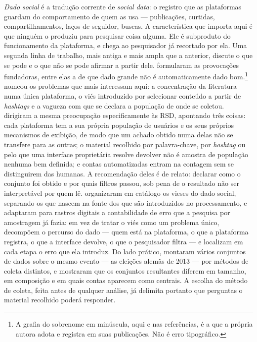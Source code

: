 \emph{Dado social} é a tradução corrente de \emph{social data}: o registro que as
plataformas guardam do comportamento de quem as usa --- publicações, curtidas,
compartilhamentos, laços de seguidor, buscas. A característica que importa aqui é que
ninguém o produziu para pesquisar coisa alguma. Ele é subproduto do funcionamento da
plataforma, e chega ao pesquisador já recortado por ela. Uma segunda linha de trabalho,
mais antiga e mais ampla que a anterior, discute o que se pode e o que não se pode
afirmar a partir dele.  formularam as
provocações fundadoras, entre elas a de que dado grande não é automaticamente dado
bom.\footnote{A grafia do sobrenome em minúscula, aqui e nas referências, é a que a
própria autora adota e registra em suas publicações. Não é erro tipográfico.}
 nomeou os problemas que mais interessam aqui: a
concentração da literatura numa única plataforma, o viés introduzido por selecionar
conteúdo a partir de \emph{hashtags} e a vagueza com que se declara a população de onde
se coletou.  dirigiram a mesma preocupação
especificamente às RSD, apontando três coisas: cada plataforma tem a sua própria
população de usuários e os seus próprios mecanismos de exibição, de modo que um achado
obtido numa delas não se transfere para as outras; o material recolhido por
palavra-chave, por \emph{hashtag} ou pelo que uma interface proprietária resolve
devolver não é amostra de população nenhuma bem definida; e contas automatizadas
entram na contagem sem se distinguirem das humanas. A recomendação deles é de relato:
declarar como o conjunto foi obtido e por quais filtros passou, sob pena de o
resultado não ser interpretável por quem lê.  organizaram em catálogo os
vieses do dado social, separando os que nascem na fonte dos que são introduzidos no
processamento, e  adaptaram para rastros digitais a
contabilidade de erro que a pesquisa por amostragem já fazia: em vez de tratar o viés
como um problema único, decompõem o percurso do dado --- quem está na plataforma, o
que a plataforma registra, o que a interface devolve, o que o pesquisador filtra --- e
localizam em cada etapa o erro que ela introduz. Do lado prático,
 montaram vários conjuntos de dados sobre o mesmo evento --- as
eleições alemãs de 2013 --- por métodos de coleta distintos, e mostraram que os
conjuntos resultantes diferem em tamanho, em composição e em quais contas aparecem como
centrais. A escolha do método de coleta, feita antes de qualquer análise, já delimita
portanto que perguntas o material recolhido poderá responder.

